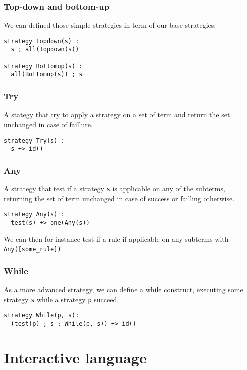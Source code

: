 \documentclass[12pt,a4paper]{article}
\begin{document}
\subsubsection*{Top-down and bottom-up}
We can defined those simple strategies in term of our base strategies.

\begin{verbatim}
strategy Topdown(s) :
  s ; all(Topdown(s))

strategy Bottomup(s) :
  all(Bottomup(s)) ; s
\end{verbatim}

\subsubsection*{Try}
A stategy that try to apply a strategy on a set of term and return the set unchanged
in case of faillure.

\begin{verbatim}
strategy Try(s) :
  s +> id() 
\end{verbatim}


\subsubsection*{Any}
A strategy that test if a strategy \verb|s| is applicable on any of the subterms,
returning the set of term unchanged in case of success or failling otherwise.

\begin{verbatim}
strategy Any(s) :
  test(s) +> one(Any(s))
\end{verbatim}

We can then for instance test if a rule if applicable on any subterms with
\verb|Any([some_rule])|.

\subsubsection*{While}
As a more advanced strategy, we can define a while construct, executing some strategy \verb|s| while a strategy \verb|p| succeed.

\begin{verbatim}
strategy While(p, s):
  (test(p) ; s ; While(p, s)) +> id()
\end{verbatim}


\section{Interactive language}
\end{document}
